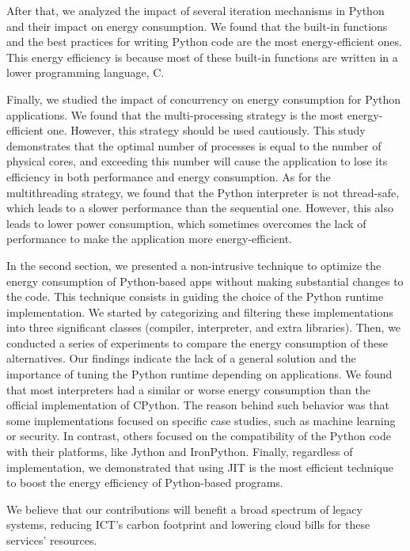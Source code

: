 After that, we analyzed the impact of several iteration mechanisms in Python and their impact on energy consumption.
We found that the built-in functions and the best practices for writing Python code are the most energy-efficient ones.
This energy efficiency is because most of these built-in functions are written in a lower programming language, C.

Finally, we studied the impact of concurrency on energy consumption for Python applications.
We found that the multi-processing strategy is the most energy-efficient one.
However, this strategy should be used cautiously.
This study demonstrates that the optimal number of processes is equal to the number of physical cores, and exceeding this number will cause the application to lose its efficiency in both performance and energy consumption.
As for the multithreading strategy, we found that the Python interpreter is not thread-safe, which leads to a slower performance than the sequential one.
However, this also leads to lower power consumption, which sometimes overcomes the lack of performance to make the application more energy-efficient.

In the second section, we presented a non-intrusive technique to optimize the energy consumption of Python-based apps without making substantial changes to the code.
This technique consists in guiding the choice of the Python runtime implementation.
We started by categorizing and filtering these implementations into three significant classes (compiler, interpreter, and extra libraries).
Then, we conducted a series of experiments to compare the energy consumption of these alternatives.
Our findings indicate the lack of a general solution and the importance of tuning the Python runtime depending on applications.
We found that most interpreters had a similar or worse energy consumption than the official implementation of CPython.
The reason behind such behavior was that some implementations focused on specific case studies, such as machine learning or security.
In contrast, others focused on the compatibility of the Python code with their platforms, like Jython and IronPython.
Finally, regardless of implementation, we demonstrated that using JIT is the most efficient technique to boost the energy efficiency of Python-based programs.

We believe that our contributions will benefit a broad spectrum of legacy systems, reducing ICT's carbon footprint and lowering cloud bills for these services' resources.